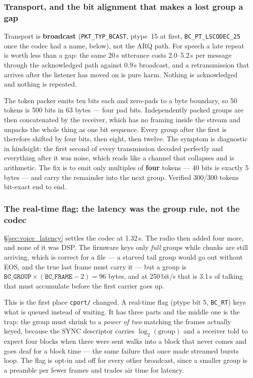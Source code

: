 \subsubsection{Transport, and the bit alignment that makes a lost group a gap}
\label{sec:voice_transport}

Transport is \textbf{broadcast} (\texttt{PKT\_TYP\_BCAST}, ptype~15 at first, \texttt{BC\_PT\_LSCODEC\_25} once the codec had a name, below),
not the ARQ path.  For speech a late repeat is worth less than a gap:
the same 20\,s utterance costs 2.0--5.2\,s per message through the
acknowledged path against 0.9\,s broadcast, and a retransmission that
arrives after the listener has moved on is pure harm.  Nothing is
acknowledged and nothing is repeated.

The token packer emits ten bits each and zero-pads to a byte boundary,
so 50 tokens is 500 bits in 63 bytes --- four pad bits.  Independently
packed groups are then concatenated by the receiver, which has no
framing inside the stream and unpacks the whole thing as one bit
sequence.  Every group after the first is therefore shifted by four
bits, then eight, then twelve.  The symptom is diagnostic in hindsight:
the first second of every transmission decoded perfectly and everything
after it was noise, which reads like a channel that collapses and is
arithmetic.  The fix is to emit only multiples of \textbf{four} tokens
--- 40 bits is exactly 5 bytes --- and carry the remainder into the
next group.  Verified 300/300 tokens bit-exact end to end.

\subsubsection{The real-time flag: the latency was the group rule, not the codec}
\S\ref{sec:voice_latency} settles the codec at 1.32\,s.  The radio then
added four more, and none of it was DSP\@.  The firmware keys only
\emph{full} groups while chunks are still arriving, which is correct
for a file --- a starved tail group would go out without EOS, and the
true last frame must carry it --- but a group is
$\texttt{BC\_GROUP}\times(\texttt{BC\_FRAME}-2) = 96$ bytes, and at
250\,bit/s that is 3.1\,s of talking that must accumulate before the
first carrier goes up.

This is the first place \texttt{cport/} changed.  A real-time flag
(ptype bit 5, \texttt{BC\_RT}) keys what is queued instead of waiting.
It has three parts and the middle one is the trap: the group must
shrink to a \emph{power of two} matching the frames actually keyed,
because the SYNC descriptor carries $\log_2(\text{group})$ and a
receiver told to expect four blocks when three were sent walks into a
block that never comes and goes deaf for a block time --- the same
failure that once made streamed bursts loop.  The flag is opt-in and
off for every other broadcast, since a smaller group is a preamble per
fewer frames and trades air time for latency.

